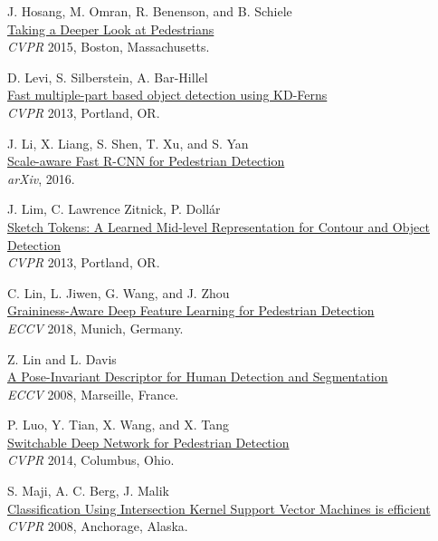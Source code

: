 \documentclass[onecolumn]{article}
\begin{document}
\begin{thebibliography}{1}
J. Hosang, M. Omran, R. Benenson, and B. Schiele\\
\href{https://www.mpi-inf.mpg.de/departments/computer-vision-and-multimodal-computing/research/people-detection-pose-estimation-and-tracking/taking-a-deeper-look-at-pedestrians/}{
Taking a Deeper Look at Pedestrians}\\
\textit{CVPR} 2015, Boston, Massachusetts.

D. Levi, S. Silberstein, A. Bar-Hillel\\
\href{https://sites.google.com/site/danmlevi/}{
Fast multiple-part based object detection using KD-Ferns}\\
\textit{CVPR} 2013, Portland, OR.

J. Li, X. Liang, S. Shen, T. Xu, and S. Yan\\
\href{http://arxiv.org/abs/1510.08160}{
Scale-aware Fast R-CNN for Pedestrian Detection}\\
\textit{arXiv}, 2016.

J. Lim, C. Lawrence Zitnick, P. Doll\'ar\\
\href{https://github.com/joelimlimit/SketchTokens}{
Sketch Tokens: A Learned Mid-level Representation for Contour and Object Detection }\\
\textit{CVPR} 2013, Portland, OR.

C. Lin, L. Jiwen, G. Wang, and J. Zhou\\
\href{http://openaccess.thecvf.com/content_ECCV_2018/html/Chunze_Lin_Graininess-Aware_Deep_Feature_ECCV_2018_paper.html}{
Graininess-Aware Deep Feature Learning for Pedestrian Detection}\\
\textit{ECCV} 2018, Munich, Germany.

Z. Lin and L. Davis\\
\href{http://www.adobe.com/technology/people/san-jose/zhe-lin.html}{
A Pose-Invariant Descriptor for Human Detection and Segmentation}\\
\textit{ECCV} 2008, Marseille, France.

P. Luo, Y. Tian, X. Wang, and X. Tang\\
\href{http://mmlab.ie.cuhk.edu.hk/publications.html}{
Switchable Deep Network for Pedestrian Detection}\\
\textit{CVPR} 2014, Columbus, Ohio.

S. Maji, A. C. Berg, J. Malik\\
\href{http://www.cs.berkeley.edu/~smaji/projects/fiksvm}{
Classification Using Intersection Kernel Support Vector Machines is efficient}\\
\textit{CVPR} 2008, Anchorage, Alaska.


\end{thebibliography}
\end{document}
